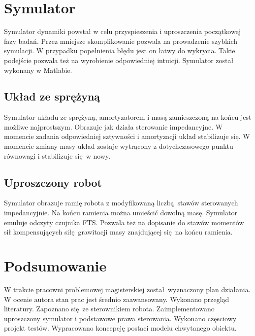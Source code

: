 \documentclass[12pt,a4paper]{article}
\begin{document}
	\section{Symulator}
	Symulator dynamiki powstał w celu przyspieszenia i uproszczenia początkowej fazy badań. Przez mniejsze skomplikowanie pozwala na prowadzenie szybkich symulacji. W przypadku popełnienia błędu jest on łatwy do wykrycia. Takie podejście pozwala też na wyrobienie odpowiedniej intuicji. Symulator został wykonany w Matlabie.

	\subsection{Układ ze sprężyną}
	Symulator układu ze sprężyną, amortyzatorem i masą zamieszczoną na końcu jest możliwe najprostszym. Obrazuje jak działa sterowanie impedancyjne. W momencie zadania odpowiedniej sztywności i amortyzacji układ stabilizuje się. W momencie zmiany masy układ zostaje wytrącony z dotychczasowego punktu równowagi i stabilizuje się w nowy.

	\subsection{Uproszczony robot}
	Symulator obrazuje ramię robota z modyfikowaną liczbą stawów sterowanych impedancyjnie. Na końcu ramienia można umieścić dowolną masę. Symulator emuluje odczyty czujnika FTS. Pozwala też na dopisanie do stawów momentów sił kompensujących siłę grawitacji masy znajdującej się na końcu ramienia.


	\section{Podsumowanie}
	W trakcie pracowni problemowej magisterskiej został wyznaczony plan działania. W ocenie autora stan prac jest średnio zaawansowany. Wykonano przegląd literatury. Zapoznano się ze sterownikiem robota. Zaimplementowano uproszczony symulator i podstawowe prawa sterowania. Wykonano częsciowy projekt testów. Wypracowano koncepcję postaci modelu chwytanego obiektu.

	
	
\end{document}

